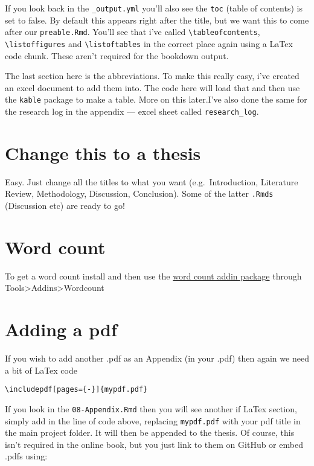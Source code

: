 \documentclass[
  12pt,
  oneside]{book}
\begin{document}
If you look back in the \texttt{\_output.yml} you'll also see the \texttt{toc} (table of contents) is set to false. By default this appears right after the title, but we want this to come after our \texttt{preable.Rmd}. You'll see that i've called \texttt{\textbackslash{}tableofcontents}, \texttt{\textbackslash{}listoffigures} and \texttt{\textbackslash{}listoftables} in the correct place again using a LaTex code chunk. These aren't required for the bookdown output.

The last section here is the abbreviations. To make this really easy, i've created an excel document to add them into. The code here will load that and then use the \texttt{kable} package to make a table. More on this later.I've also done the same for the research log in the appendix --- excel sheet called \texttt{research\_log}.

\hypertarget{change-this-to-a-thesis}{%
\section{Change this to a thesis}\label{change-this-to-a-thesis}}

Easy. Just change all the titles to what you want (e.g.~Introduction, Literature Review, Methodology, Discussion, Conclusion). Some of the latter \texttt{.Rmds} (Discussion etc) are ready to go!

\hypertarget{word-count}{%
\section{Word count}\label{word-count}}

To get a word count install and then use the \href{https://github.com/benmarwick/wordcountaddin}{word count addin package} through Tools\textgreater Addins\textgreater Wordcount

\hypertarget{adding-a-pdf}{%
\section{Adding a pdf}\label{adding-a-pdf}}

If you wish to add another .pdf as an Appendix (in your .pdf) then again we need a bit of LaTex code

\texttt{\textbackslash{}includepdf{[}pages=\{-\}{]}\{mypdf.pdf\}}

If you look in the \texttt{08-Appendix.Rmd} then you will see another if LaTex section, simply add in the line of code above, replacing \texttt{mypdf.pdf} with your pdf title in the main project folder. It will then be appended to the thesis. Of course, this isn't required in the online book, but you just link to them on GitHub or embed .pdfs using:
\end{document}
